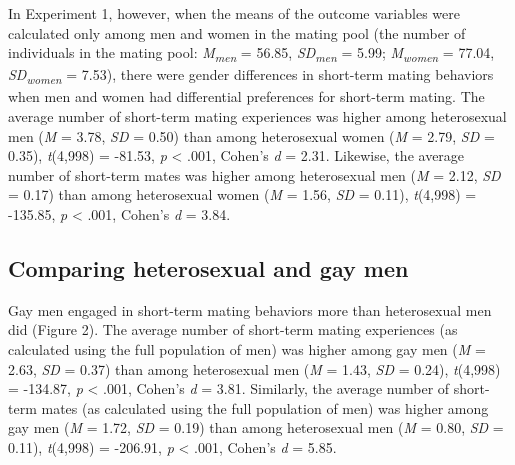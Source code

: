 \documentclass[
  11pt,
]{article}
\begin{document}
In Experiment 1, however, when the means of the outcome variables were
calculated only among men and women in the mating pool (the number of
individuals in the mating pool: \emph{M\textsubscript{men}} = 56.85,
\emph{SD\textsubscript{men}} = 5.99; \emph{M\textsubscript{women}} =
77.04, \emph{SD\textsubscript{women}} = 7.53), there were gender
differences in short-term mating behaviors when men and women had
differential preferences for short-term mating. The average number of
short-term mating experiences was higher among heterosexual men
(\emph{M} = 3.78, \emph{SD} = 0.50) than among heterosexual women
(\emph{M} = 2.79, \emph{SD} = 0.35), \emph{t}(4,998) = -81.53, \emph{p}
\textless{} .001, Cohen's \emph{d} = 2.31. Likewise, the average number
of short-term mates was higher among heterosexual men (\emph{M} = 2.12,
\emph{SD} = 0.17) than among heterosexual women (\emph{M} = 1.56,
\emph{SD} = 0.11), \emph{t}(4,998) = -135.85, \emph{p} \textless{} .001,
Cohen's \emph{d} = 3.84.

\hypertarget{comparing-heterosexual-and-gay-men}{%
\subsection{Comparing heterosexual and gay
men}\label{comparing-heterosexual-and-gay-men}}

Gay men engaged in short-term mating behaviors more than heterosexual
men did (Figure 2). The average number of short-term mating experiences
(as calculated using the full population of men) was higher among gay
men (\emph{M} = 2.63, \emph{SD} = 0.37) than among heterosexual men
(\emph{M} = 1.43, \emph{SD} = 0.24), \emph{t}(4,998) = -134.87, \emph{p}
\textless{} .001, Cohen's \emph{d} = 3.81. Similarly, the average number
of short-term mates (as calculated using the full population of men) was
higher among gay men (\emph{M} = 1.72, \emph{SD} = 0.19) than among
heterosexual men (\emph{M} = 0.80, \emph{SD} = 0.11), \emph{t}(4,998) =
-206.91, \emph{p} \textless{} .001, Cohen's \emph{d} = 5.85.
\end{document}
